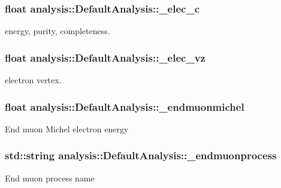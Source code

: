 \subsubsection[{\texorpdfstring{\+\_\+elec\+\_\+c}{_elec_c}}]{\setlength{\rightskip}{0pt plus 5cm}float analysis\+::\+Default\+Analysis\+::\+\_\+elec\+\_\+c\hspace{0.3cm}{\ttfamily [private]}}\hypertarget{classanalysis_1_1DefaultAnalysis_a5ce51cfe745fbf0327541a1877a99f87}{}\label{classanalysis_1_1DefaultAnalysis_a5ce51cfe745fbf0327541a1877a99f87}
energy, purity, completeness. 
\subsubsection[{\texorpdfstring{\+\_\+elec\+\_\+vz}{_elec_vz}}]{\setlength{\rightskip}{0pt plus 5cm}float analysis\+::\+Default\+Analysis\+::\+\_\+elec\+\_\+vz\hspace{0.3cm}{\ttfamily [private]}}\hypertarget{classanalysis_1_1DefaultAnalysis_ad728b8375e4d62c128d767fcebbab1d9}{}\label{classanalysis_1_1DefaultAnalysis_ad728b8375e4d62c128d767fcebbab1d9}
electron vertex. 
\subsubsection[{\texorpdfstring{\+\_\+endmuonmichel}{_endmuonmichel}}]{\setlength{\rightskip}{0pt plus 5cm}float analysis\+::\+Default\+Analysis\+::\+\_\+endmuonmichel\hspace{0.3cm}{\ttfamily [private]}}\hypertarget{classanalysis_1_1DefaultAnalysis_a3797bcb310074825add03ce03175fdc3}{}\label{classanalysis_1_1DefaultAnalysis_a3797bcb310074825add03ce03175fdc3}
End muon Michel electron energy 
\subsubsection[{\texorpdfstring{\+\_\+endmuonprocess}{_endmuonprocess}}]{\setlength{\rightskip}{0pt plus 5cm}std\+::string analysis\+::\+Default\+Analysis\+::\+\_\+endmuonprocess\hspace{0.3cm}{\ttfamily [private]}}\hypertarget{classanalysis_1_1DefaultAnalysis_a8cbb24a231e167258d2914f92bc4af22}{}\label{classanalysis_1_1DefaultAnalysis_a8cbb24a231e167258d2914f92bc4af22}
End muon process name 
